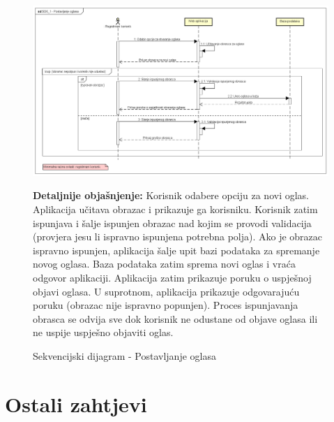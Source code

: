 				\begin{figure}[hp!]
					\centering
					\includegraphics[width=\textwidth]{slike/SD6_1 - Postavljanje oglasa.png}
					\caption{Sekvencijski dijagram - Postavljanje oglasa}
					\begin{flushleft}
						\textbf{Detaljnije objašnjenje:}
						Korisnik odabere opciju za novi oglas. Aplikacija učitava obrazac i prikazuje ga korisniku. Korisnik zatim ispunjava i šalje ispunjen obrazac nad kojim se provodi validacija (provjera jesu li ispravno ispunjena potrebna polja). Ako je obrazac ispravno ispunjen, aplikacija šalje upit bazi podataka za spremanje novog oglasa. Baza podataka zatim sprema novi oglas i vraća odgovor aplikaciji. Aplikacija zatim prikazuje poruku o uspješnoj objavi oglasa. U suprotnom, aplikacija prikazuje odgovarajuću poruku (obrazac nije ispravno popunjen). Proces ispunjavanja obrasca se odvija sve dok korisnik ne odustane od objave oglasa ili ne uspije uspješno objaviti oglas. 
					\end{flushleft}
				\end{figure}
				\eject

		\section{Ostali zahtjevi}

